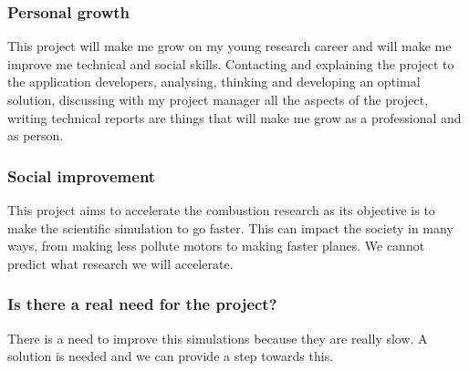 \subsubsection{Personal growth}

This project will make me grow on my young research career and will make me improve me technical and social skills. Contacting and explaining the project to the application developers, analysing, thinking and developing an optimal solution, discussing with my project manager all the aspects of the project, writing technical reports are things that will make me grow as a professional and as person.

\subsubsection{Social improvement}

This project aims to accelerate the combustion research as its objective is to make the scientific simulation to go faster. This can impact the society in many ways, from making less pollute motors to making faster planes. We cannot predict what research we will accelerate. 

\subsubsection{Is there a real need for the project?}

There is a need to improve this simulations because they are really slow. A solution is needed and we can provide a step towards this. 
